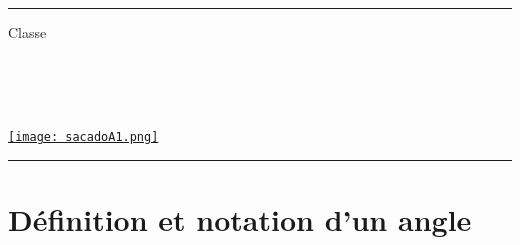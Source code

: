 \documentclass[a4paper,dvipsnames]{article}
\begin{document}

\fancyhead[C]{}
\hrule\medskip %
\begin{minipage}{0.295\textwidth} 
\raggedright
Classe \myClasse \hfill\\
\myDiscipline \hfill\\
\myParcours \hfill\\
\end{minipage}
\begin{minipage}{0.4\textwidth} 
\centering 
\scshape\huge
\textcolor{sacado_purple}{\myTitle} \\ 
\normalsize 
\end{minipage}
\begin{minipage}{0.295\textwidth} 
\raggedleft
\href{https://sacado.xyz/}{\texttt{[image: sacadoA1.png]}}
\end{minipage}
\medskip \hrule
\bigskip


%

\section{Définition et notation d'un angle}
\end{document}
